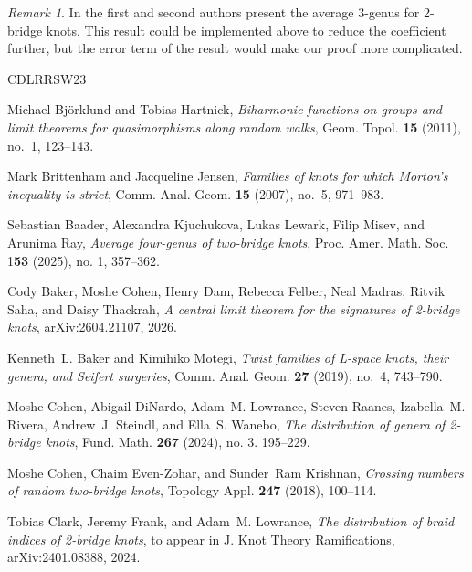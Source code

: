 \documentclass[12pt]{amsart}
\theoremstyle{definition}
\theoremstyle{remark}
\newtheorem{remark}[theorem]{Remark}
\numberwithin{equation}{section}
\begin{document}
\begin{remark}
In \cite{CohLow} the first and second authors present the average 3-genus for 2-bridge knots.  This result could be implemented above to reduce the coefficient further, but the error term of the result would make our proof more complicated.
\end{remark}

\newcommand{\etalchar}[1]{$^{#1}$}
\def\cprime{$'$}
\providecommand{\bysame}{\leavevmode\hbox to3em{\hrulefill}\thinspace}
\begin{thebibliography}{CDLRRSW23}

Michael Bj\"{o}rklund and Tobias Hartnick, \emph{Biharmonic functions on groups
  and limit theorems for quasimorphisms along random walks}, Geom. Topol.
  \textbf{15} (2011), no.~1, 123--143.

Mark Brittenham and Jacqueline Jensen, \emph{Families of knots for which
  {M}orton's inequality is strict}, Comm. Anal. Geom. \textbf{15} (2007),
  no.~5, 971--983.

Sebastian Baader, Alexandra Kjuchukova, Lukas Lewark, Filip Misev, and Arunima
  Ray, \emph{Average four-genus of two-bridge knots}, Proc. Amer. Math. Soc. 1\textbf{53} (2025), no. 1, 357--362.

\bibitem[BCDFM{\etalchar{+}}26]{BCDFMST}
Cody Baker, Moshe Cohen, Henry Dam, Rebecca Felber, Neal Madras, Ritvik Saha, and Daisy Thackrah, \emph{A central limit theorem for the signatures of 2-bridge knots}, arXiv:2604.21107, 2026.

Kenneth~L. Baker and Kimihiko Motegi, \emph{Twist families of {L}-space knots,
  their genera, and {S}eifert surgeries}, Comm. Anal. Geom. \textbf{27} (2019),
  no.~4, 743--790.

\bibitem[CDLRR{\etalchar{+}}24]{CohLowURSI}
Moshe Cohen, Abigail DiNardo, Adam~M. Lowrance, Steven Raanes, Izabella~M.
  Rivera, Andrew~J. Steindl, and Ella~S. Wanebo, \emph{The distribution of
  genera of 2-bridge knots}, Fund. Math. \textbf{267} (2024), no. 3. 195--229.

Moshe Cohen, Chaim Even-Zohar, and Sunder~Ram Krishnan, \emph{Crossing numbers
  of random two-bridge knots}, Topology Appl. \textbf{247} (2018), 100--114.

Tobias Clark, Jeremy Frank, and Adam~M. Lowrance, \emph{The distribution of
  braid indices of 2-bridge knots}, to appear in J. Knot Theory Ramifications, arXiv:2401.08388, 2024.


\end{thebibliography}
\end{document}
